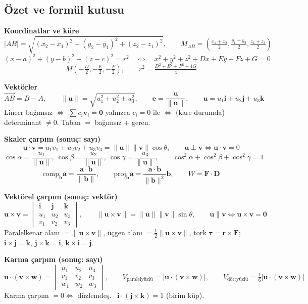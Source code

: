 \subsection{Özet ve formül kutusu}

\begin{ozet}
\textbf{Koordinatlar ve küre}
\[
|AB|=\sqrt{(x_2-x_1)^2+(y_2-y_1)^2+(z_2-z_1)^2},\qquad
M_{AB}=\left(\tfrac{x_1+x_2}{2},\tfrac{y_1+y_2}{2},\tfrac{z_1+z_2}{2}\right)
\]
\[
(x-a)^2+(y-b)^2+(z-c)^2=r^2\quad\Longleftrightarrow\quad x^2+y^2+z^2+Dx+Ey+Fz+G=0
\]
\[
M\left(-\tfrac D2,-\tfrac E2,-\tfrac F2\right),\qquad r^2=\tfrac{D^2+E^2+F^2-4G}{4}
\]

\textbf{Vektörler}
\[
\overrightarrow{AB}=B-A,\qquad \|\mathbf u\|=\sqrt{u_1^2+u_2^2+u_3^2},\qquad \mathbf e=\frac{\mathbf u}{\|\mathbf u\|},\qquad \mathbf u=u_1\mathbf i+u_2\mathbf j+u_3\mathbf k
\]
Lineer bağımsız $\iff$ $\sum c_i\mathbf v_i=\mathbf 0$ yalnızca $c_i=0$ ile $\iff$ (kare durumda) determinant $\neq0$. Taban $=$ bağımsız $+$ geren.

\textbf{Skaler çarpım (sonuç: sayı)}
\[
\mathbf u\cdot\mathbf v=u_1v_1+u_2v_2+u_3v_3=\|\mathbf u\|\|\mathbf v\|\cos\theta,\qquad \mathbf u\perp\mathbf v\iff\mathbf u\cdot\mathbf v=0
\]
\[
\cos\alpha=\frac{u_1}{\|\mathbf u\|},\ \cos\beta=\frac{u_2}{\|\mathbf u\|},\ \cos\gamma=\frac{u_3}{\|\mathbf u\|},\qquad \cos^2\alpha+\cos^2\beta+\cos^2\gamma=1
\]
\[
\text{comp}_{\mathbf b}\mathbf a=\frac{\mathbf a\cdot\mathbf b}{\|\mathbf b\|},\qquad \text{proj}_{\mathbf b}\mathbf a=\frac{\mathbf a\cdot\mathbf b}{\|\mathbf b\|^2}\mathbf b,\qquad W=\mathbf F\cdot\mathbf D
\]

\textbf{Vektörel çarpım (sonuç: vektör)}
\[
\mathbf u\times\mathbf v=\begin{vmatrix}\mathbf i&\mathbf j&\mathbf k\\u_1&u_2&u_3\\v_1&v_2&v_3\end{vmatrix},\qquad
\|\mathbf u\times\mathbf v\|=\|\mathbf u\|\|\mathbf v\|\sin\theta,\qquad \mathbf u\parallel\mathbf v\iff\mathbf u\times\mathbf v=\mathbf 0
\]
Paralelkenar alanı $=\|\mathbf u\times\mathbf v\|$, üçgen alanı $=\frac12\|\mathbf u\times\mathbf v\|$, tork $\boldsymbol\tau=\mathbf r\times\mathbf F$; \ $\mathbf i\times\mathbf j=\mathbf k$, $\mathbf j\times\mathbf k=\mathbf i$, $\mathbf k\times\mathbf i=\mathbf j$.

\textbf{Karma çarpım (sonuç: sayı)}
\[
\mathbf u\cdot(\mathbf v\times\mathbf w)=\begin{vmatrix}u_1&u_2&u_3\\v_1&v_2&v_3\\w_1&w_2&w_3\end{vmatrix},\qquad
V_{\text{paralelyüzlü}}=|\mathbf u\cdot(\mathbf v\times\mathbf w)|,\qquad V_{\text{dörtyüzlü}}=\tfrac16|\mathbf u\cdot(\mathbf v\times\mathbf w)|
\]
Karma çarpım $=0\iff$ düzlemdeş. \ $\mathbf i\cdot(\mathbf j\times\mathbf k)=1$ (birim küp).
\end{ozet}
